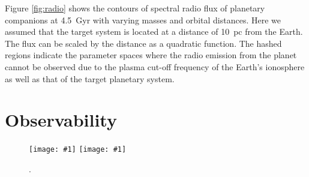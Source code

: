 \documentclass{emulateapj}
\def\plotonesc#1{\centering \leavevmode
\texttt{[image: \#1]}}
\def\plotoneh#1{\centering \leavevmode
\texttt{[image: \#1]}}
\begin{document}
Figure \ref{fig:radio} shows the contours of spectral radio flux of planetary companions at 4.5~Gyr with varying masses and orbital distances. Here we assumed that the target system is located at a distance of 10~pc from the Earth. The flux can be scaled by the distance as a quadratic function. 
The hashed regions indicate the parameter spaces where the radio emission from the planet cannot be observed due to the plasma cut-off frequency of the Earth's ionosphere as well as that of the target planetary system. 





\section{Observability}
\label{s:observability}


\begin{figure}[tbhp]
   \plotoneh{radio_1Mp_5AU.pdf}
   \plotoneh{radio_5Mp_5AU.pdf}
   \caption{.}
  \label{fig:observability}
\end{figure}
\end{document}
